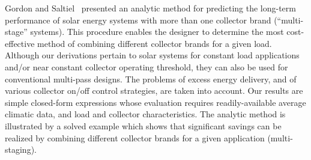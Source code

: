 %

Gordon and Saltiel~\cite{Gordon1986} presented an analytic method for predicting the long-term performance of solar energy systems with more than one collector brand (“multi-stage” systems). This procedure enables the designer to determine the most cost-effective method of combining different collector brands for a given load. Although our derivations pertain to solar systems for constant load applications and/or near constant collector operating threshold, they can also be used for conventional multi-pass designs. The problems of excess energy delivery, and of various collector on/off control strategies, are taken into account. Our results are simple closed-form expressions whose evaluation requires readily-available average climatic data, and load and collector characteristics. The analytic method is illustrated by a solved example which shows that significant savings can be realized by combining different collector brands for a given application (multi-staging).


